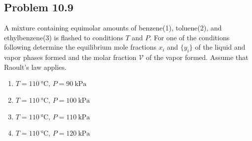 \documentclass{article}
\begin{document}
\subsection*{Problem 10.9}
A mixture containing equimolar amounts of benzene(1), toluene(2), and
ethylbenzene(3) is flashed to conditions $T$ and $P$. For one of the
conditions following determine the equilibrium mole fractions
{$x_{i}$} and $\{y_{i}\}$ of the liquid and vapor phases formed and
the molar fraction $\mathcal{V}$ of the vapor formed. Assume that
Raoult's law applies.
\begin{enumerate}[label=(\alph*)]
  \item $T=110~\unit{\degreeCelsius}$, $P=90~\unit{\kilo\pascal}$
  \item $T=110~\unit{\degreeCelsius}$, $P=100~\unit{\kilo\pascal}$
  \item $T=110~\unit{\degreeCelsius}$, $P=110~\unit{\kilo\pascal}$
  \item $T=110~\unit{\degreeCelsius}$, $P=120~\unit{\kilo\pascal}$
\end{enumerate}
\end{document}
